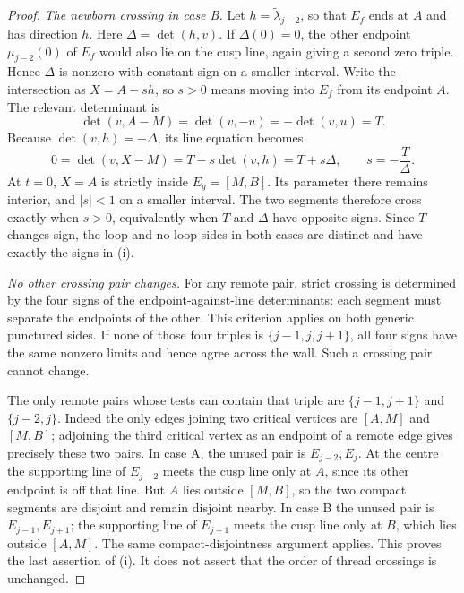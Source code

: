 \begin{proof}
\emph{The newborn crossing in case B.}
Let $h=\widetilde\lambda_{j-2}$, so that $E_f$ ends at $A$ and has
direction $h$. Here $\Delta=\det(h,v)$. If $\Delta(0)=0$, the other
endpoint $\mu_{j-2}(0)$ of $E_f$ would also lie on the cusp line, again
giving a second zero triple. Hence $\Delta$ is nonzero with constant sign
on a smaller interval. Write the intersection as $X=A-s h$, so $s>0$
means moving into $E_f$ from its endpoint $A$. The relevant determinant is
\begin{equation}\label{cusppr:B-det}
\det(v,A-M)=\det(v,-u)=-\det(v,u)=T.
\end{equation}
Because $\det(v,h)=-\Delta$, its line equation becomes
\begin{equation}\label{cusppr:B-intersection}
0=\det(v,X-M)=T-s\det(v,h)=T+s\Delta,
\qquad s=-\frac{T}{\Delta}.
\end{equation}
At $t=0$, $X=A$ is strictly inside $E_g=[M,B]$. Its parameter there
remains interior, and $|s|<1$ on a smaller interval. The two segments
therefore cross exactly when $s>0$, equivalently when $T$ and $\Delta$
have opposite signs. Since $T$ changes sign, the loop and no-loop sides
in both cases are distinct and have exactly the signs in (i).

\emph{No other crossing pair changes.}
For any remote pair, strict crossing is determined by the four signs of the
endpoint-against-line determinants: each segment must separate the endpoints
of the other. This criterion applies on both generic punctured sides.
If none of those four triples is $\{j-1,j,j+1\}$, all four signs have
the same nonzero limits and hence agree across the wall. Such a crossing
pair cannot change.

The only remote pairs whose tests can contain that triple are
$\{j-1,j+1\}$ and $\{j-2,j\}$. Indeed the only edges joining two critical
vertices are $[A,M]$ and $[M,B]$; adjoining the third critical vertex as an
endpoint of a remote edge gives precisely these two pairs. In case A,
the unused pair is $E_{j-2},E_j$. At the centre the supporting line of
$E_{j-2}$ meets the cusp line only at $A$, since its other endpoint is
off that line. But $A$ lies outside $[M,B]$, so the two compact segments
are disjoint and remain disjoint nearby. In case B the unused pair is
$E_{j-1},E_{j+1}$; the supporting line of $E_{j+1}$ meets the cusp line
only at $B$, which lies outside $[A,M]$. The same compact-disjointness
argument applies. This proves the last assertion of (i). It does not
assert that the order of thread crossings is unchanged.


\end{proof}
